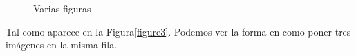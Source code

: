 \documentclass[12pt]{article}
\begin{document}
\begin{figure}[!ht]
	\quad
	\caption{Varias figuras}
	\label{figure3}
\end{figure}
Tal como aparece en la Figura\eqref{figure3}. Podemos
ver la forma en como poner tres imágenes en la misma fila.
\end{document}
